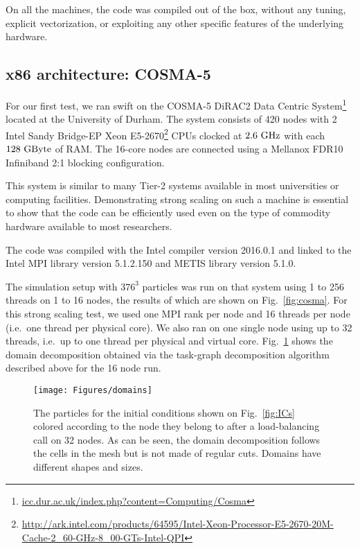 \documentclass{sig-alternate-05-2015}
\newcommand{\swift}{{\sc swift}\xspace}
\begin{document}
On all the machines, the code was compiled out of the box,
without any tuning, explicit vectorization, or exploiting any
other specific features of the underlying hardware. 

\subsection{x86 architecture: COSMA-5}

For our first test, we ran \swift on the COSMA-5 DiRAC2 Data Centric
System\footnote{\url{icc.dur.ac.uk/index.php?content=Computing/Cosma}}
located at the University of Durham. The system consists of 420 nodes
with 2 Intel Sandy Bridge-EP Xeon
E5-2670\footnote{\url{http://ark.intel.com/products/64595/Intel-Xeon-Processor-E5-2670-20M-Cache-2_60-GHz-8_00-GTs-Intel-QPI}}
CPUs clocked at $2.6~\rm{GHz}$ with each $128~\rm{GByte}$ of RAM. The
16-core nodes are connected using a Mellanox FDR10 Infiniband 2:1 blocking
configuration.

This system is similar to many Tier-2 systems available in most universities or
computing facilities. Demonstrating strong scaling on such a machine is
essential to show that the code can be efficiently used even on the type of
commodity hardware available to most researchers.

The code was compiled with the Intel compiler version \textsc{2016.0.1} and
linked to the Intel MPI library version \textsc{5.1.2.150} and METIS library
version \textsc{5.1.0}.

The simulation setup with $376^3$ particles was run on that system using 1 to
256 threads on 1 to 16 nodes, the results of which are shown on
Fig.~\ref{fig:cosma}. For this strong scaling test, we used one MPI rank per node and 16
threads per node (i.e.~one thread per physical core). We also ran on one single
node using up to 32 threads, i.e.~up to one thread per physical and
virtual core. Fig.~\ref{fig:domains} shows the domain decomposition
obtained via the task-graph decomposition algorithm described above for
the 16 node run.

\begin{figure}
\centering
\texttt{[image: Figures/domains]}
\caption{The particles for the initial conditions shown on Fig.~\ref{fig:ICs}
  colored according to the node they belong to after a load-balancing call on
  32 nodes. As can be seen, the domain decomposition follows the cells in the mesh
  but is not made of regular cuts. Domains have different shapes and
  sizes. \label{fig:domains}}
\end{figure}  
\end{document}
